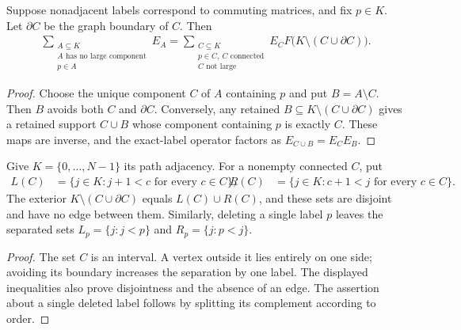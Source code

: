 \begin{lemma}
    \label{thm:retained_crossing_component_sum}
    \leanok
    Suppose nonadjacent labels correspond to commuting matrices,
    and fix $p\in K$. Let $\partial C$ be the graph boundary of $C$.
    Then
    \begin{align}
        \sum_{\substack{A\subseteq K  \\A\text{ has no large component}\\p\in A}}E_A
        =\sum_{\substack{C\subseteq K \\p\in C,\ C\text{ connected}\\C\text{ not large}}}
        E_C F\bigl(K\setminus(C\cup\partial C)\bigr).
        \label{eq:retained_crossing_component_sum}
    \end{align}
\end{lemma}
\begin{proof}\leanok
    Choose the unique component $C$ of $A$ containing $p$ and put
    $B=A\setminus C$. Then $B$ avoids both $C$ and $\partial C$.
    Conversely, any retained $B\subseteq K\setminus(C\cup\partial C)$
    gives a retained support $C\cup B$ whose component containing $p$
    is exactly $C$. These maps are inverse, and the exact-label
    operator factors as $E_{C\cup B}=E_CE_B$.
\end{proof}

\begin{lemma}
    \label{thm:cluster_path_exterior_sides}
    \leanok
    Give $K=\{0,\ldots,N-1\}$ its path adjacency. For a nonempty
    connected $C$, put
    \begin{align}
        L(C) & =\{j\in K:j+1<c\text{ for every }c\in C\},
             & R(C)                                       & =\{j\in K:c+1<j\text{ for every }c\in C\}.
        \label{eq:cluster_path_exterior_sides}
    \end{align}
    The exterior $K\setminus(C\cup\partial C)$ equals $L(C)\cup R(C)$,
    and these sets are disjoint and have no edge between them.
    Similarly, deleting a single label $p$ leaves the separated sets
    $L_p=\{j:j<p\}$ and $R_p=\{j:p<j\}$.
\end{lemma}
\begin{proof}\leanok
    The set $C$ is an interval. A vertex outside it lies entirely
    on one side; avoiding its boundary increases the separation by
    one label. The displayed inequalities also prove disjointness
    and the absence of an edge. The assertion about a single deleted
    label follows by splitting its complement according to order.
\end{proof}

